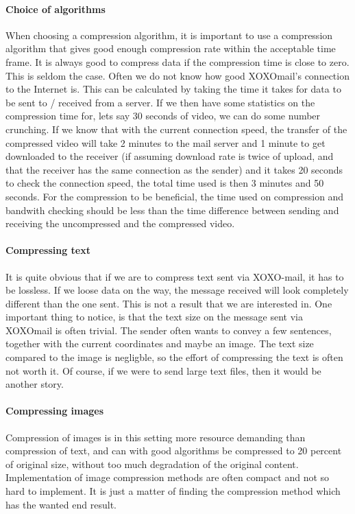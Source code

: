 \paragraph{Choice of algorithms}\hfill
\newline
When choosing a compression algorithm, it is important to use a compression algorithm that gives good enough compression rate within the acceptable time frame. It is always good to compress data if the compression time is close to zero. This is seldom the case.
\newline
\newline
Often we do not know how good XOXOmail's connection to the Internet is. This can be calculated by taking the time it takes for data to be sent to / received from a server. If we then have some statistics on the compression time for, lets say 30 seconds of video, we can do some number crunching. If we know that with the current connection speed, the transfer of the compressed video will take 2 minutes to the mail server and 1 minute to get downloaded to the receiver (if assuming download rate is twice of upload, and that the receiver has the same connection as the sender) and it takes 20 seconds to check the connection speed, the total time used is then 3 minutes and 50 seconds. For the compression to be beneficial, the time used on compression and bandwith checking should be less than the time difference between sending and receiving the uncompressed and the compressed video.

\paragraph{Compressing text} \hfill
\newline
It is quite obvious that if we are to compress text sent via XOXO-mail, it has to be lossless. If we loose data on the way, the message received will look completely different than the one sent. This is not a result that we are interested in. One important thing to notice, is that the text size on the message sent via XOXOmail is often trivial. The sender often wants to convey a few sentences, together with the current coordinates and maybe an image. The text size compared to the image is negligble, so the effort of compressing the text is often not worth it. Of course, if we were to send large text files, then it would be another story.

\paragraph{Compressing images} \hfill
\newline
Compression of images is in this setting more resource demanding than compression of text, and can with good algorithms be compressed to 20 percent of original size, without too much degradation of the original content. Implementation of image compression methods are often compact and not so hard to implement. It is just a matter of finding the compression method which has the wanted end result.

